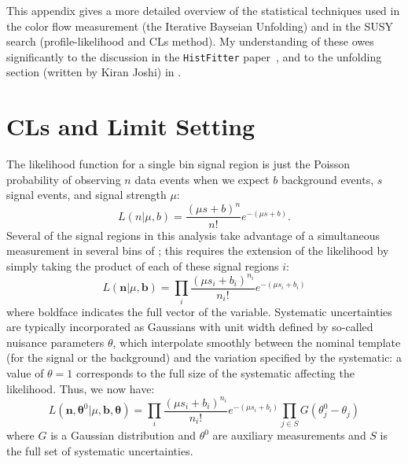 \label{appendix:statistics}

This appendix gives a more detailed overview of the statistical techniques used in the color flow measurement (the Iterative Bayseian Unfolding) and in the SUSY search (profile-likelihood and CLs method). My understanding of these owes significantly to the discussion in the \texttt{HistFitter} paper~\cite{Baak:2014wma}, and to the unfolding section (written by Kiran Joshi) in \cite{Nachman:1728288}.

\section{CLs and Limit Setting}


The likelihood function for a single bin signal region is just the Poisson probability of observing $n$ data events when we expect $b$ background events, $s$ signal events, and signal strength $\mu$:
%
\begin{equation}
L(n|\mu,b) = \frac{(\mu s + b)^n}{n!} e^{-(\mu s + b)}.
\end{equation}
%
Several of the signal regions in this analysis take advantage of a simultaneous measurement in several bins of \MJ; this requires the extension of the likelihood by simply taking the product of each of these signal regions $i$:
%
\begin{equation}
L(\boldsymbol{n}|\mu,\boldsymbol{b}) = \prod_i \frac{(\mu s_i + b_i)^{n_i}}{n_i!} e^{-(\mu s_i + b_i)}
\end{equation}
%
where boldface indicates the full vector of the variable. Systematic uncertainties are typically incorporated as Gaussians with unit width defined by so-called nuisance parameters $\theta$, which interpolate smoothly between the nominal template (for the signal or the background) and the variation specified by the systematic: a value of $\theta = 1$ corresponds to the full size of the systematic affecting the likelihood. Thus, we now have:
%
\begin{equation}
L(\boldsymbol{n}, \boldsymbol{\theta}^0 |\mu,\boldsymbol{b},\boldsymbol{\theta}) = \prod_i \frac{(\mu s_i + b_i)^{n_i}}{n_i!} e^{-(\mu s_i + b_i)} \prod_{j \in S} G(\theta^0_j - \theta_j )
\end{equation}
%
where $G$ is a Gaussian distribution and $\theta^0$ are auxiliary measurements and $S$ is the full set of systematic uncertainties.

